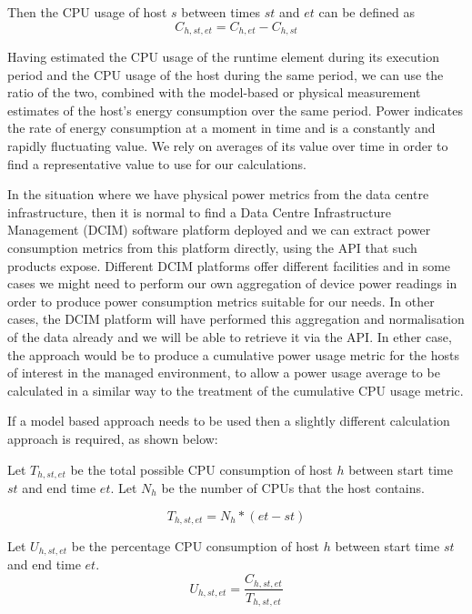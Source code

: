 Then the CPU usage of host $s$ between times $st$ and $et$ can be defined as
\begin{equation}
C_{h,st,et} = C_{h,et} - C_{h,st}
\end{equation}

Having estimated the CPU usage of the runtime element during its execution period and the CPU usage of the host during the same period, we can use the ratio of the two, combined with the model-based or physical measurement estimates of the host's energy consumption over the same period.  Power indicates the rate of energy consumption at a moment in time and is a constantly and rapidly fluctuating value. We rely on averages of its value over time in order to find a representative value to use for our calculations.

In the situation where we have physical power metrics from the data centre infrastructure, then it is normal to find a Data Centre Infrastructure Management (DCIM) software platform deployed and we can extract power consumption metrics from this platform directly, using the API that such products expose. Different DCIM platforms offer different facilities and in some cases we might need to perform our own aggregation of device power readings in order to produce power consumption metrics suitable for our needs.  In other cases, the DCIM platform will have performed this aggregation and normalisation of the data already and we will be able to retrieve it via the API.  In ether case, the approach would be to produce a cumulative power usage metric for the hosts of interest in the managed environment, to allow a power usage average to be calculated in a similar way to the treatment of the cumulative CPU usage metric.

If a model based approach needs to be used then a slightly different calculation approach is required, as shown below:

Let $T_{h,st,et}$ be the total possible CPU consumption of host $h$ between start time $st$ and end time $et$.  Let $N_{h}$ be the number of CPUs that the host contains.

\begin{equation}
T_{h,st,et} = N_{h} * (et - st)
\end{equation}

Let $U_{h,st,et}$ be the percentage CPU consumption of host $h$ between start time $st$ and end time $et$.
\begin{equation}
U_{h,st,et} = \frac{C_{h,st,et}}{T_{h,st,et}}
\end{equation}

